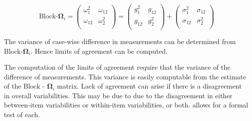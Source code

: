 \documentclass[12pt, a4paper]{article}
\theoremstyle{plain}
\theoremstyle{definition}
\theoremstyle{remark}
\begin{document}
	\[ \textrm{Block-}\boldsymbol{\Omega}_{i}  = \left(\begin{array}{cc}
	\omega^2_1  & \omega_{12} \\
	\omega_{12} & \omega^2_2 \\
	\end{array}  \right)
	=  \left(
	\begin{array}{cc}
	g^2_1  & g_{12} \\
	g_{12} & g^2_2 \\
	\end{array} \right)+
	\left(
	\begin{array}{cc}
	\sigma^2_1  & \sigma_{12} \\
	\sigma_{12} & \sigma^2_2 \\
	\end{array}\right)
	\]
	
	The variance of case-wise difference in measurements can be determined from Block-$\boldsymbol{\Omega}_{i}$. Hence limits of agreement can be computed.
	
	
	The computation of the limits of agreement require that the variance of the difference of measurements. This variance is easily computable from the estimate of the ${\mbox{Block - }\boldsymbol \Omega_{i}}$ matrix. Lack of agreement can arise if there is a disagreement in overall variabilities. This may be due to due to the disagreement in either between-item
	variabilities or within-item variabilities, or both. \citet{ARoy2009} allows for a formal test of each.
	\newpage

	
	
\end{document}
